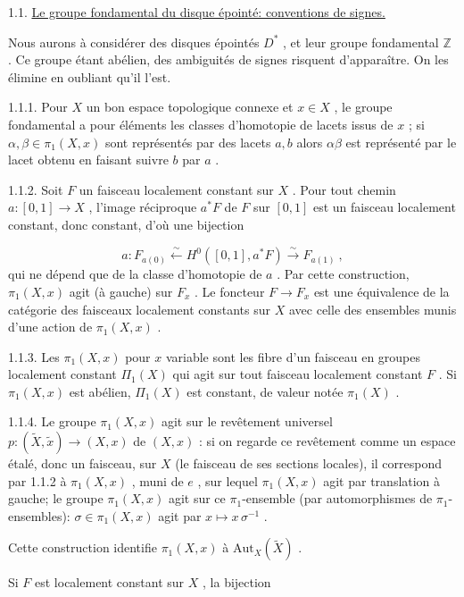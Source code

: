 1.1. \underline{Le groupe fondamental du disque épointé: conventions de signes.}

Nous aurons à considérer des disques épointés $D^*$ , et leur groupe fondamental $\mathbb{Z}$ . Ce groupe étant abélien, des ambiguités de signes risquent d'apparaître. On les élimine en oubliant qu'il l'est.

1.1.1. Pour $X$ un bon espace topologique connexe et $x \in X$ , le groupe fondamental a pour éléments les classes d'homotopie de lacets issus de $x$ ; si $\alpha, \beta \in \pi_1(X, x)$ sont représentés par des lacets $a, b$ alors $\alpha \beta$ est représenté par le lacet obtenu en faisant suivre $b$ par $a$ .

1.1.2. Soit $F$ un faisceau localement constant sur $X$ . Pour tout chemin $a : [0, 1] \to X$ , l'image réciproque $a^*F$ de $F$ sur $[0, 1]$ est un faisceau localement constant, donc constant, d'où une bijection

\begin{equation*}
a : F_{a(0)} \xleftarrow{\ \sim\ } H^0([0, 1], a^*F) \xrightarrow{\ \sim\ } F_{a(1)} \ ,
\end{equation*}
qui ne dépend que de la classe d'homotopie de $a$ . Par cette construction, $\pi_1(X, x)$ agit (à gauche) sur $F_x$ . Le foncteur $F \to F_x$ est une équivalence de la catégorie des faisceaux localement constants sur $X$ avec celle des ensembles munis d'une action de $\pi_1(X, x)$ .

1.1.3. Les $\pi_1(X, x)$ pour $x$ variable sont les fibre d'un faisceau en groupes localement constant $\Pi_1(X)$ qui agit sur tout faisceau localement constant $F$ . Si $\pi_1(X, x)$ est abélien, $\Pi_1(X)$ est constant, de valeur notée $\pi_1(X)$ .

1.1.4. Le groupe $\pi_1(X, x)$ agit sur le revêtement universel $p : (\tilde{X}, \tilde{x}) \to (X, x)$ de $(X, x)$ : si on regarde ce revêtement comme un espace étalé, donc un faisceau, sur $X$ (le faisceau de ses sections locales), il correspond par 1.1.2 à $\pi_1(X, x)$ ,
muni de $e$ , sur lequel $\pi_1(X, x)$ agit par translation à gauche; le groupe $\pi_1(X, x)$ agit sur ce $\pi_1$-ensemble (par automorphismes de $\pi_1$-ensembles): $\sigma \in \pi_1(X, x)$ agit par $x \longmapsto x\,\sigma^{-1}$ .

Cette construction identifie $\pi_1(X, x)$ à $\mathrm{Aut}_X(\tilde{X})$ .

Si $F$ est localement constant sur $X$ , la bijection

